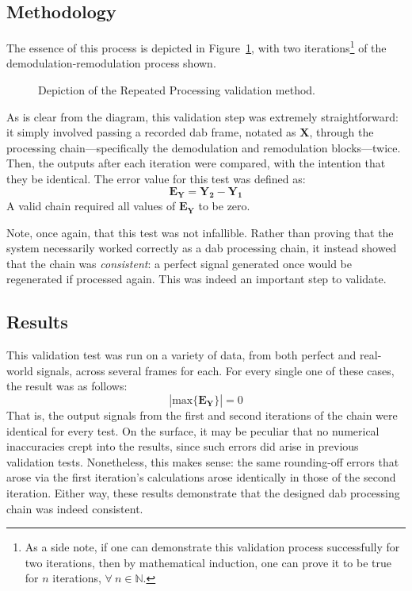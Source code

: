 \documentclass[class=report,11pt,crop=false]{standalone}
\begin{document}
\subsection{Methodology}
The essence of this process is depicted in Figure~\ref{fig:repeated-process-diagram}, with two iterations\footnote{As a side note, if one can demonstrate this validation process successfully for two iterations, then by mathematical induction, one can prove it to be true for \(n\) iterations, \(\forall \: n \in \mathbb{N}\).} of the demodulation-remodulation process shown.

\begin{figure}[htbp]
  \centering
  \captionsetup{type=figure}
  \def\svgwidth{\linewidth}
  { %
      }
  \caption{Depiction of the Repeated Processing validation method.}
  \label{fig:repeated-process-diagram}
\end{figure}

As is clear from the diagram, this validation step was extremely straightforward: it simply involved passing a recorded \gls{dab} frame, notated as \(\mathbf{X}\), through the processing chain---specifically the demodulation and remodulation blocks---twice. Then, the outputs after each iteration were compared, with the intention that they be identical. The error value for this test was defined as:
\begin{equation}
  \mathbf{E_{Y}} = \mathbf{Y_2} - \mathbf{Y_1}
\end{equation}
A valid chain required all values of \(\mathbf{E_Y}\) to be zero.%

Note, once again, that this test was not infallible. Rather than proving that the system necessarily worked correctly as a \gls{dab} processing chain, it instead showed that the chain was \emph{consistent}: a perfect signal generated once would be regenerated if processed again. This was indeed an important step to validate.

\subsection{Results}
This validation test was run on a variety of data, from both perfect and real-world signals, across several frames for each. For every single one of these cases, the result was as follows:
\begin{equation}
  \left| \mathrm{max} \{ \mathbf{E_Y} \} \right| = 0
\end{equation}
That is, the output signals from the first and second iterations of the chain were identical for every test. On the surface, it may be peculiar that no numerical inaccuracies crept into the results, since such errors did arise in previous validation tests. Nonetheless, this makes sense: the same rounding-off errors that arose via the first iteration's calculations arose identically in those of the second iteration. Either way, these results demonstrate that the designed \gls{dab} processing chain was indeed consistent.
\end{document}
